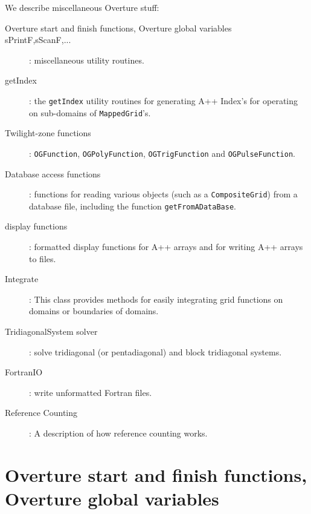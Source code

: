 \documentclass{article}
\begin{document}
\begin{flushleft}
We describe miscellaneous Overture stuff:
\begin{description}
 \item[Overture start and finish functions, Overture global variables]
 \item[sPrintF,sScanF,...] : miscellaneous utility routines.
 \item[getIndex] : the {\tt getIndex} utility routines for generating A++ Index's for operating
     on sub-domains of {\tt MappedGrid}'s.
  \item[Twilight-zone functions]: {\tt OGFunction}, {\tt OGPolyFunction}, {\tt OGTrigFunction} and
      {\tt OGPulseFunction}.
  \item[Database access functions]: functions for reading various objects (such as a {\tt CompositeGrid})
     from a database file, including the function {\tt getFromADataBase}.
  \item[display functions] : formatted display functions for A++ arrays and for writing A++ arrays to files.
  \item[Integrate] : This class provides methods for easily integrating grid functions on domains
      or boundaries of domains.
  \item[TridiagonalSystem solver] : solve tridiagonal (or pentadiagonal) and block tridiagonal systems.
  \item[FortranIO] : write unformatted Fortran files.
  \item[Reference Counting]: A description of how reference counting works.
\end{description}
\end{flushleft}

\vfill\eject
\tableofcontents


\vfill\eject
\section{Overture start and finish functions, Overture global variables}

\end{document}
